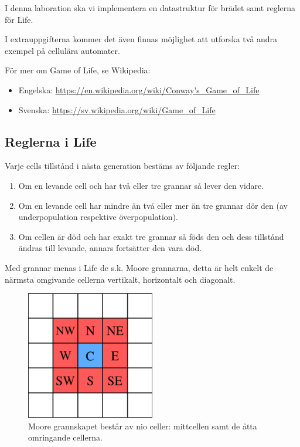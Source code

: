 \vspace{5mm}

I denna laboration ska vi implementera en datastruktur för brädet samt reglerna för Life.

I extrauppgifterna kommer det även finnas möjlighet att utforska två andra exempel på cellulära automater.

\vspace{5mm}


För mer om Game of Life, se Wikipedia:

\begin{itemize}[noitemsep,topsep=0pt]
    	\item Engelska: \url{https://en.wikipedia.org/wiki/Conway's_Game_of_Life}
    	\item Svenska: \url{https://sv.wikipedia.org/wiki/Game_of_Life}
\end{itemize}


\subsection{Reglerna i Life}
\label{subsec:life-rules}

Varje cells tillstånd i nästa generation bestäms av följande regler:
\begin{enumerate}
    \item Om en levande cell och har två eller tre grannar så lever den vidare.
    \item Om en levande cell har mindre än två eller mer än tre grannar dör den (av underpopulation respektive överpopulation).
    \item Om cellen är död och har exakt tre grannar så föds den och dess tillstånd ändras till levande, annars fortsätter den vara död.
\end{enumerate}

Med grannar menas i Life de s.k. Moore grannarna, detta är helt enkelt de närmsta omgivande cellerna vertikalt, horizontalt och diagonalt.

\begin{figure}[h]
  \begin{center}
    \includegraphics[width=0.5\textwidth]{../img/w12-lab/moore_neighborhood.png}
  \end{center}
  \caption{Moore grannskapet består av nio celler: mittcellen samt de åtta omringande cellerna.\protect\footnotemark}
\end{figure}


